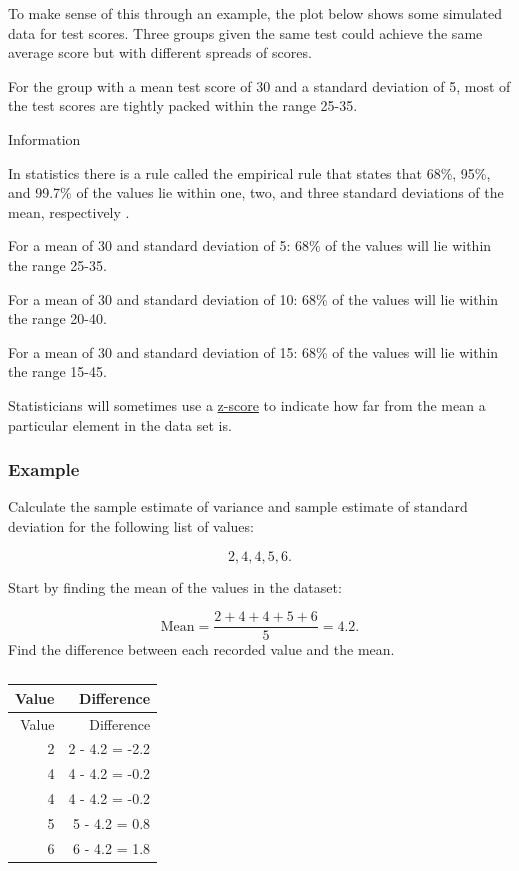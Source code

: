 \documentclass[
]{book}
\begin{document}
To make sense of this through an example, the plot below shows some simulated data for test scores. Three groups given the same test could achieve the same average score but with different spreads of scores.

For the group with a mean test score of 30 and a standard deviation of 5, most of the test scores are tightly packed within the range 25-35.

Information

In statistics there is a rule called the empirical rule that states that 68\%, 95\%, and 99.7\% of the values lie within one, two, and three standard deviations of the mean, respectively \citep{lee}.

For a mean of 30 and standard deviation of 5: 68\% of the values will lie within the range 25-35.

For a mean of 30 and standard deviation of 10: 68\% of the values will lie within the range 20-40.

For a mean of 30 and standard deviation of 15: 68\% of the values will lie within the range 15-45.

Statisticians will sometimes use a \protect\hyperlink{example2}{z-score} to indicate how far from the mean a particular element in the data set is.

\hypertarget{example-10}{%
\subsubsection{Example}\label{example-10}}

Calculate the sample estimate of variance and sample estimate of standard deviation for the following list of values:

\[ 2, 4, 4, 5, 6.\]

Start by finding the mean of the values in the dataset:

\[ \textrm{Mean}= \frac{2 + 4 + 4 + 5 + 6}{5}=4.2.\]
Find the difference between each recorded value and the mean.

\begin{longtable}[]{@{}rr@{}}
\caption{\label{tab:table8}}\tabularnewline
\toprule
Value & Difference \\
\midrule
\endfirsthead
\toprule
Value & Difference \\
\midrule
\endhead
2 & 2 - 4.2 = -2.2 \\
4 & 4 - 4.2 = -0.2 \\
4 & 4 - 4.2 = -0.2 \\
5 & 5 - 4.2 = 0.8 \\
6 & 6 - 4.2 = 1.8 \\
\bottomrule
\end{longtable}
\end{document}
